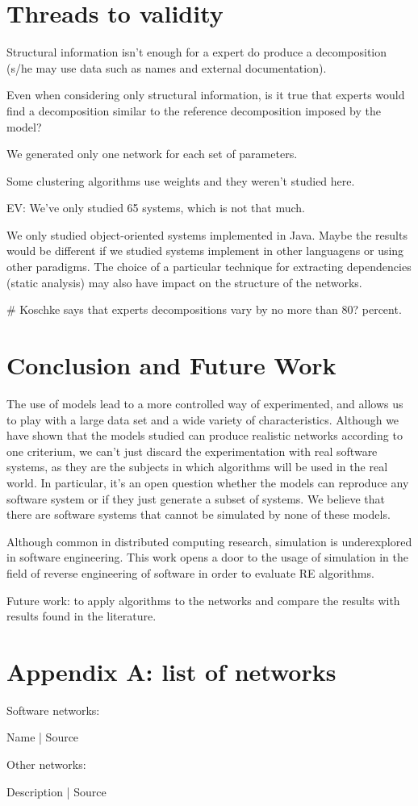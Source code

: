 \section{Threads to validity}

Structural information isn't enough for a expert do produce a
decomposition (s/he may use data such as names and external documentation). 

Even when considering only structural information, is it true
that experts would find a decomposition similar to the reference decomposition
imposed by the model?

We generated only one network for each set of parameters.

Some clustering algorithms use weights and they weren't studied here.

EV: We've only studied 65 systems, which is not that much.

We only studied object-oriented systems implemented in Java. Maybe the results
would be different if we studied systems implement in other languagens or using
other paradigms. The choice of a particular technique for extracting
dependencies (static analysis) may also have impact on the structure of the
networks.

# Koschke says that experts decompositions vary by no more than 80? percent.

\section{Conclusion and Future Work}

The use of models lead to a more controlled way of experimented, and allows us
to play with a large data set and a wide variety of characteristics. Although
we have shown that the models studied can produce realistic networks according
to one criterium, we can't just discard the experimentation with real software
systems, as they are the subjects in which algorithms will be used in the
real world. In particular, it's an open question whether the models can 
reproduce any software system or if they just generate a subset of systems.
We believe that there are software systems that cannot be simulated by none
of these models.

Although common in distributed computing research, simulation is underexplored
in software engineering. This work opens a door to the usage of simulation in
the field of reverse engineering of software in order to evaluate RE 
algorithms.

Future work: to apply algorithms to the networks and compare the results with
results found in the literature.

\section{Appendix A: list of networks}

Software networks:

Name | Source

Other networks:

Description | Source



